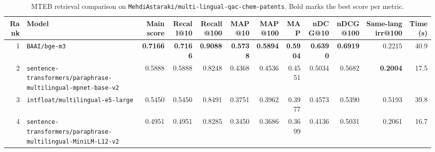 \begin{table}[t]
\centering
\small
\begin{tabular}{r l r r r r r r r r r r}
\hline
Rank & Model & Main score & Recall@10 & Recall@100 & MAP@10 & MAP@100 & MAP & nDCG@10 & nDCG@100 & Same-lang irr@100 & Time (s) \\
\hline
1 & \texttt{BAAI/bge-m3} & \textbf{0.7166} & \textbf{0.7166} & \textbf{0.9088} & \textbf{0.5738} & \textbf{0.5894} & \textbf{0.5904} & \textbf{0.6390} & \textbf{0.6919} & 0.2215 & 40.9 \\
2 & \texttt{sentence-transformers/paraphrase-multilingual-mpnet-base-v2} & 0.5888 & 0.5888 & 0.8248 & 0.4368 & 0.4536 & 0.4551 & 0.5034 & 0.5682 & \textbf{0.2004} & 17.5 \\
3 & \texttt{intfloat/multilingual-e5-large} & 0.5450 & 0.5450 & 0.8491 & 0.3751 & 0.3962 & 0.3977 & 0.4573 & 0.5390 & 0.5193 & 39.8 \\
4 & \texttt{sentence-transformers/paraphrase-multilingual-MiniLM-L12-v2} & 0.4951 & 0.4951 & 0.8285 & 0.3450 & 0.3686 & 0.3699 & 0.4136 & 0.5031 & 0.2061 & 16.7 \\
\hline
\end{tabular}
\caption{MTEB retrieval comparison on \texttt{MehdiAstaraki/multi-lingual-qac-chem-patents}. Bold marks the best score per metric.}
\label{tab:mteb-model-comparison}
\end{table}
